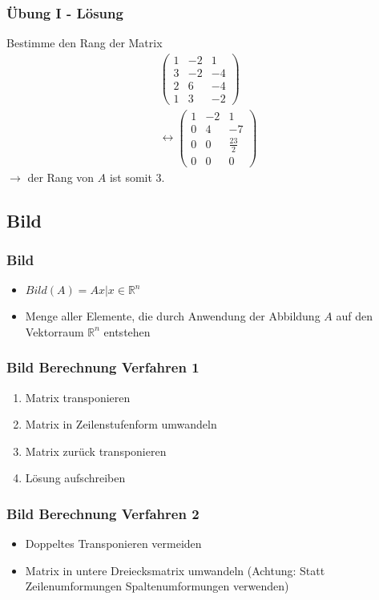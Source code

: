 \begin{frame}
	\frametitle{Übung I - Lösung}
	Bestimme den Rang der Matrix
	\begin{align*}
		\begin{pmatrix}
			1 & -2 & 1 \\
			3 & -2 & -4 \\
			2 & 6 & -4 \\
			1 & 3 & -2 
		\end{pmatrix} \\
		\leftrightarrow
		\begin{pmatrix}
			1 & -2 & 1 \\
			0 & 4 & -7 \\
			0 & 0 & \frac{23}{2} \\
			0 & 0 & 0
		\end{pmatrix} 
	\end{align*}
	$\rightarrow$ der Rang von $A$ ist somit $3$.
\end{frame}


\subsection{Bild}
\begin{frame}
    \frametitle{Bild}
    \begin{itemize}
        \item $Bild(A)={Ax | x\in \mathbb{R}^n}$
        \item Menge aller Elemente, die durch Anwendung der Abbildung $A$ auf den Vektorraum $\mathbb{R}^n$ entstehen
    \end{itemize}
\end{frame}

\begin{frame}
    \frametitle{Bild Berechnung Verfahren 1}
    \begin{enumerate}
        \item Matrix transponieren
		\item Matrix in Zeilenstufenform umwandeln
		\item Matrix zurück transponieren
		\item Lösung aufschreiben
    \end{enumerate}
\end{frame}

\begin{frame}
    \frametitle{Bild Berechnung Verfahren 2}
    \begin{itemize}
        \item Doppeltes Transponieren vermeiden
		\item Matrix in untere Dreiecksmatrix umwandeln (Achtung: Statt Zeilenumformungen Spaltenumformungen verwenden)
    \end{itemize}
\end{frame}

